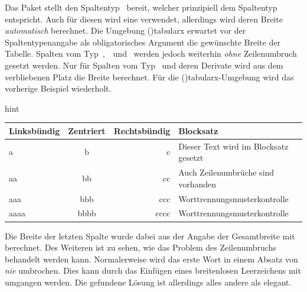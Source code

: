 \documentclass[%
  english,ngerman,%
  cdgeometry=no,DIV=12,%
  cd=false,cdfont=false,cdtitle=true,%
  headings=normal,%
  automark,%
  listof=toc,%
]{tudscrartcl}
\makeatletter
\newcommand*\pcolumnfuzz[1]{\pretocmd\@endpbox{\hfuzz=#1}{}{}}
\makeatother
\begin{document}
Das Paket  stellt den Spaltentyp~ bereit, welcher 
prinzipiell dem Spaltentyp~ entspricht. Auch für diesen wird eine 
 verwendet, allerdings wird deren Breite \emph{automatisch} 
berechnet. Die Umgebung \Environment(){tabularx} erwartet vor 
der Spaltentypenangabe als obligatorisches Argument die gewünschte Breite der 
Tabelle. Spalten vom Typ~,~~und~ werden jedoch 
weiterhin \emph{ohne} Zeilenumbruch gesetzt werden. Nur für Spalten vom 
Typ~ und deren Derivate wird aus dem verbliebenen Platz die Breite 
berechnet. Für die \Environment(){tabularx}-Umgebung wird 
das vorherige Beispiel wiederholt.
%
\begingroup
\pcolumnfuzz{70pt}
\begin{Code}[input]{hint}
\begin{tabularx}{11.7cm}[b]{lcrX}
\toprule
\textbf{Linksbündig} & \textbf{Zentriert} & 
\textbf{Rechtsbündig} & \textbf{Blocksatz} \tabularnewline\midrule
a    & b    & c    & Dieser Text wird im Blocksatz gesetzt\tabularnewline
aa   & bb   & cc   & Auch Zeilenumbrüche sind vorhanden\tabularnewline
aaa  & bbb  & ccc  & Worttrennungsmusterkontrolle\tabularnewline
aaaa & bbbb & cccc & \hspace{0pt}Worttrennungsmusterkontrolle
\tabularnewline\bottomrule
\end{tabularx}
\end{Code}
\endgroup

Die Breite der letzten Spalte wurde dabei aus der Angabe der Gesamtbreite mit 
\PValue{11.7cm} berechnet. Des Weiteren ist zu sehen, wie das Problem des 
Zeilenumbruchs behandelt werden kann. Normalerweise wird das erste Wort in 
einem Absatz von  \emph{nie} umbrochen. Dies kann durch das 
Einfügen eines breitenlosen Leerzeichens mit  
umgangen werden. Die gefundene Lösung ist allerdings alles andere als elegant.
\end{document}
